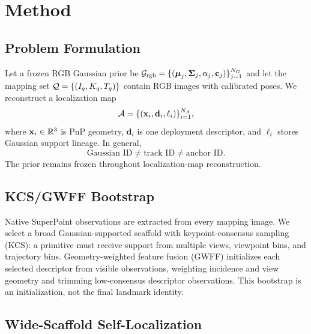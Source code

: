 \section{Method}

\subsection{Problem Formulation}

Let a frozen RGB Gaussian prior be
$\mathcal{G}_{\mathrm{rgb}}=\{(\boldsymbol\mu_j,\boldsymbol\Sigma_j,
\alpha_j,\mathbf{c}_j)\}_{j=1}^{N_G}$ and let the mapping set
$\mathcal{Q}=\{(I_q,K_q,T_q)\}$ contain RGB images with calibrated poses. We
reconstruct a localization map
\begin{equation}
  \mathcal{A}=\{(\mathbf{x}_i,\mathbf{d}_i,\ell_i)\}_{i=1}^{N_A},
\end{equation}
where $\mathbf{x}_i\in\mathbb{R}^3$ is PnP geometry, $\mathbf{d}_i$ is one deployment
descriptor, and $\ell_i$ stores Gaussian support lineage. In general,
\begin{equation}
  \text{Gaussian ID}\neq\text{track ID}\neq\text{anchor ID}.
\end{equation}
The prior remains frozen throughout localization-map reconstruction.

\subsection{KCS/GWFF Bootstrap}

Native SuperPoint observations are extracted from every mapping image. We
select a broad Gaussian-supported scaffold with keypoint-consensus sampling
(KCS): a primitive must receive support from multiple views, viewpoint bins,
and trajectory bins. Geometry-weighted feature fusion (GWFF) initializes each
selected descriptor from visible observations, weighting incidence and view
geometry and trimming low-consensus descriptor observations. This bootstrap is
an initialization, not the final landmark identity.

\subsection{Wide-Scaffold Self-Localization}

